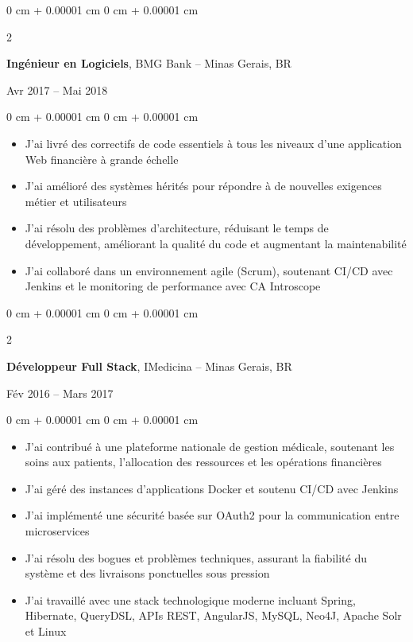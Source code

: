 \documentclass[10pt, letterpaper]{article}
\newenvironment{highlights}{
    \begin{itemize}[
        topsep=0.10 cm,
        parsep=0.10 cm,
        partopsep=0pt,
        itemsep=0pt,
        leftmargin=0 cm + 10pt
    ]
}{
    \end{itemize}
} %
\newenvironment{onecolentry}{
    \begin{adjustwidth}{
        0 cm + 0.00001 cm
    }{
        0 cm + 0.00001 cm
    }
}{
    \end{adjustwidth}
} %
\newenvironment{twocolentry}[2][]{
    \onecolentry
    \def\secondColumn{#2}
    \setcolumnwidth{\fill, 4.5 cm}
    \begin{paracol}{2}
}{
    \switchcolumn \raggedleft \secondColumn
    \end{paracol}
    \endonecolentry
} %
\begin{document}
        \vspace{0.2 cm}

        \begin{twocolentry}{
            Avr 2017 – Mai 2018
        }
            \textbf{Ingénieur en Logiciels}, BMG Bank -- Minas Gerais, BR
        \end{twocolentry}

        \vspace{0.10 cm}
        
                \begin{onecolentry}
            \begin{highlights}
                \item J'ai livré des correctifs de code essentiels à tous les niveaux d'une application Web financière à grande échelle
                \item J'ai amélioré des systèmes hérités pour répondre à de nouvelles exigences métier et utilisateurs
                \item J'ai résolu des problèmes d'architecture, réduisant le temps de développement, améliorant la qualité du code et augmentant la maintenabilité
                \item J'ai collaboré dans un environnement agile (Scrum), soutenant CI/CD avec Jenkins et le monitoring de performance avec CA Introscope
            \end{highlights}
        \end{onecolentry}
        
        \vspace{0.2 cm}
        

        \begin{twocolentry}{
            Fév 2016 – Mars 2017
        }
            \textbf{Développeur Full Stack}, IMedicina -- Minas Gerais, BR
        \end{twocolentry}

        \vspace{0.10 cm}
        
        \begin{onecolentry}
            \begin{highlights}
                \item J'ai contribué à une plateforme nationale de gestion médicale, soutenant les soins aux patients, l’allocation des ressources et les opérations financières
                \item J'ai géré des instances d'applications Docker et soutenu CI/CD avec Jenkins
                \item J'ai implémenté une sécurité basée sur OAuth2 pour la communication entre microservices
                \item J'ai résolu des bogues et problèmes techniques, assurant la fiabilité du système et des livraisons ponctuelles sous pression
                \item J'ai travaillé avec une stack technologique moderne incluant Spring, Hibernate, QueryDSL, APIs REST, AngularJS, MySQL, Neo4J, Apache Solr et Linux
            \end{highlights}
        \end{onecolentry}
        
\end{document}
